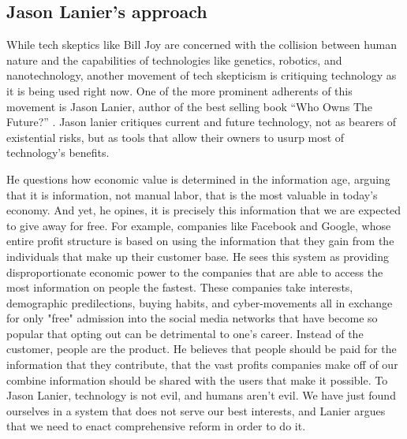 \subsection{Jason Lanier's approach}
  While tech skeptics like Bill Joy are concerned with the 
  collision between human nature and the capabilities of technologies 
  like genetics, robotics, and nanotechnology, another movement of 
  tech skepticism is critiquing technology as it is being used right 
  now. One of the more prominent adherents of this movement is Jason 
  Lanier, author of the best selling book ``Who Owns The Future?''
  \cite{lanier2014owns}. Jason lanier critiques current and future 
  technology, not as bearers of existential risks, but as tools that 
  allow their owners to usurp most of technology's benefits. 
  
  He questions how economic value is determined in the information age, 
  arguing that it is information, not manual labor, that is the most 
  valuable in today's economy.  And yet, he opines, it is precisely this 
  information that we are expected to give away for free. For example, 
  companies like Facebook and Google, whose entire profit structure is 
  based on using the information that they gain from the individuals 
  that make up their customer base. He sees this system as providing 
  disproportionate economic power to the companies that are able to 
  access the most information on people the fastest.  These companies 
  take interests, demographic predilections, buying habits, and 
  cyber-movements all in exchange for only "free" admission into the 
  social media networks that have become so popular that opting out 
  can be detrimental to one's career. Instead of the customer, people 
  are the product.  He believes that people should be paid for the 
  information that they contribute, that the vast profits companies 
  make off of our combine information should be shared with the users 
  that make it possible.  To Jason Lanier, technology is not evil, and 
  humans aren't evil.  We have just found ourselves in a system that 
  does not serve our best interests, and Lanier argues that we need 
  to enact comprehensive reform in order to do it.

\label{sec:-jason}
